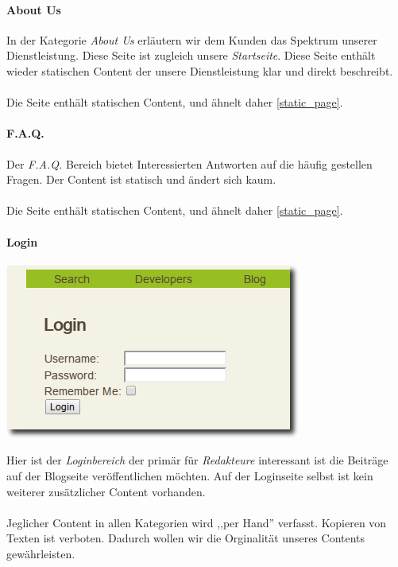 \paragraph{About Us}
In der Kategorie \emph{About Us} erläutern wir dem Kunden das Spektrum unserer
Dienstleistung. Diese Seite ist zugleich unsere \emph{Startseite}. Diese Seite
enthält wieder statischen Content der unsere Dienstleistung klar und direkt
beschreibt.
\\
\\
Die Seite enthält statischen Content, und ähnelt daher \ref{static_page}.

\paragraph{F.A.Q.}
Der \emph{F.A.Q.} Bereich bietet Interessierten Antworten auf die häufig
gestellen Fragen. Der Content ist statisch und ändert sich kaum. 
\\
\\
Die Seite enthält statischen Content, und ähnelt daher \ref{static_page}.

\paragraph{Login}

\begin{center}
\includegraphics[scale=0.5]{../screenshots/login.png}
\end{center}

Hier ist der \emph{Loginbereich} der primär für \emph{Redakteure} interessant
ist die Beiträge auf der Blogseite veröffentlichen möchten. Auf der Loginseite
selbst ist kein weiterer zusätzlicher Content vorhanden.
\\
\\
Jeglicher Content in allen Kategorien wird ,,per Hand'' verfasst. Kopieren von
Texten ist verboten. Dadurch wollen wir die Orginalität unseres Contents
gewährleisten.

